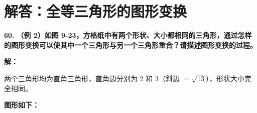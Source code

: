 \newpage



\section{解答：全等三角形的图形变换}

\vspace{0.6cm}

\textbf{\LARGE 60.} \textbf{（例 2）如图 9-23，方格纸中有两个形状、大小都相同的三角形，通过怎样的图形变换可以使其中一个三角形与另一个三角形重合？请描述图形变换的过程。}

\vspace{0.4cm}
\textbf{解：}

两个三角形均为直角三角形，直角边分别为 $2$ 和 $3$（斜边 $= \sqrt{13}$），形状大小完全相同。

\textbf{图形如下：}

